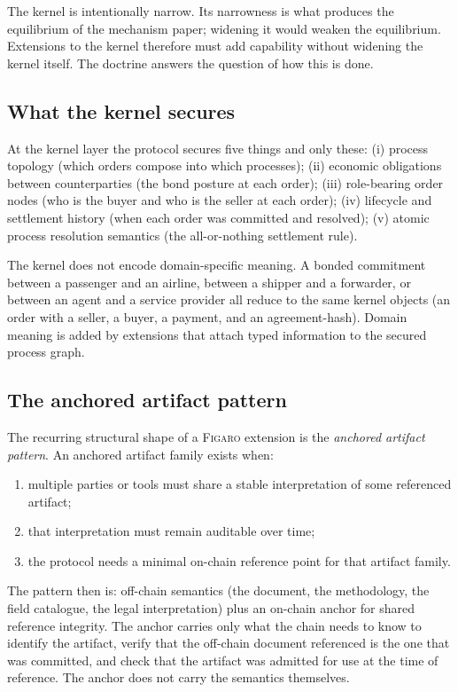 \documentclass[11pt,a4paper]{article}
\theoremstyle{definition}
\theoremstyle{remark}
\newcommand{\figaro}{\textsc{Figaro}}
\begin{document}
The kernel is intentionally narrow. Its narrowness is what produces
the equilibrium of the mechanism paper; widening it would weaken the
equilibrium. Extensions to the kernel therefore must add capability
without widening the kernel itself. The doctrine answers the question
of how this is done.

\subsection{What the kernel secures}

At the kernel layer the protocol secures five things and only these:
(i) process topology (which orders compose into which processes);
(ii) economic obligations between counterparties (the bond posture
at each order); (iii) role-bearing order nodes (who is the buyer and
who is the seller at each order); (iv) lifecycle and settlement
history (when each order was committed and resolved); (v) atomic
process resolution semantics (the all-or-nothing settlement rule).

The kernel does not encode domain-specific meaning. A bonded
commitment between a passenger and an airline, between a shipper and
a forwarder, or between an agent and a service provider all reduce
to the same kernel objects (an order with a seller, a buyer, a
payment, and an agreement-hash). Domain meaning is added by
extensions that attach typed information to the secured process
graph.

\subsection{The anchored artifact pattern}

The recurring structural shape of a \figaro{} extension is the
\emph{anchored artifact pattern}. An anchored artifact family
exists when:

\begin{enumerate}[label=(\arabic*)]
  \item multiple parties or tools must share a stable interpretation
    of some referenced artifact;
  \item that interpretation must remain auditable over time;
  \item the protocol needs a minimal on-chain reference point for
    that artifact family.
\end{enumerate}

The pattern then is: off-chain semantics (the document, the
methodology, the field catalogue, the legal interpretation) plus an
on-chain anchor for shared reference integrity. The anchor carries
only what the chain needs to know to identify the artifact, verify
that the off-chain document referenced is the one that was committed,
and check that the artifact was admitted for use at the time of
reference. The anchor does not carry the semantics themselves.
\end{document}
